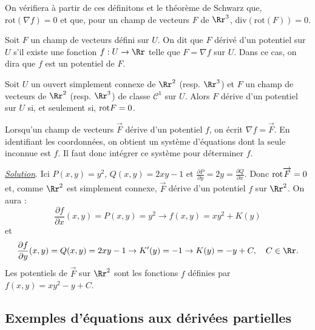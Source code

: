 \documentclass[class=report,crop=false]{standalone}
\begin{document}
\vskip4mm

\noindent On vérifiera à partir de ces définitons et le théorème de Schwarz que, $\mbox{rot}(\nabla f)=0$ et que, pour un champ de vecteurs $F$ de $\Rr^3$, $\mathrm{div}(\mathrm{rot}(F))=0$.

\vskip6mm

\begin{definition}Soit $F$ un champ de vecteurs défini sur $U$. On dit que $F$ dérivé d'un potentiel sur $U$ s'il existe une fonction $f:U\to \Rr$ telle que $F= \nabla f$ sur $U$. Dans ce cas, on dira que $f$ est un potentiel de $F$.
\end{definition}

\vskip4mm

\begin{theoreme}[\bf Poincaré]Soit $U$ un ouvert simplement connexe de $\Rr^2$ (resp. $\Rr^3$) et $F$ un champ de vecteurs de $\Rr^2$ (resp. $\Rr^3$) de classe ${\mathscr C}^1$ sur $U$. Alors $F$ dérive d'un potentiel sur $U$ si, et seulement si, ${\rm rot} F=0$.
\end{theoreme}

\vskip6mm

Lorsqu'un champ de vecteurs $\overrightarrow{F}$ dérive d'un potentiel $f$, on écrit $\displaystyle \nabla f=\overrightarrow{F}$. En identifiant les coordonnées, on obtient un système d'équations dont la seule inconnue est $f$. Il faut donc intégrer ce système pour déterminer $f$.

\vskip6mm


\vskip4mm

\noindent \underline{\it Solution}. \rm Ici $P(x,y)=y^2$, $Q(x,y)=2xy-1$ et $\displaystyle \frac{\partial P}{\partial y}=2y=\frac{\partial Q}{\partial x}$. Donc ${\rm rot} \overrightarrow{F}=0$ et, comme $\Rr^2$ est simplement connexe, $\overrightarrow{F}$ dérive d'un potentiel $f$ sur $\Rr^2$. On aura :
$$\frac{\partial f}{\partial x}(x,y)=P(x,y)=y^2\rightarrow f(x,y)=xy^2+K(y)$$
et 
$$\frac{\partial f}{\partial y}(x,y)=Q(x,y)=2xy-1\rightarrow K'(y)=-1\rightarrow K(y)=-y+C,\quad C\in \Rr.$$
Les potentiels de $\overrightarrow{F}$ sur $\Rr^2$ sont les fonctions $f$ définies par $f(x,y)=xy^2-y+C$.

\vskip8mm

\subsection{Exemples d'équations aux dérivées partielles}
\end{document}
